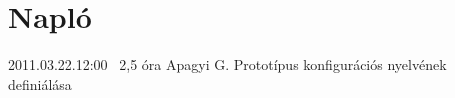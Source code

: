 %
\section{Napló}

\begin{naplo}

\bejegyzes
{2011.03.22.12:00~} %
{2,5 óra} %
{Apagyi G.} %
{Prototípus konfigurációs nyelvének definiálása} %


\end{naplo}

